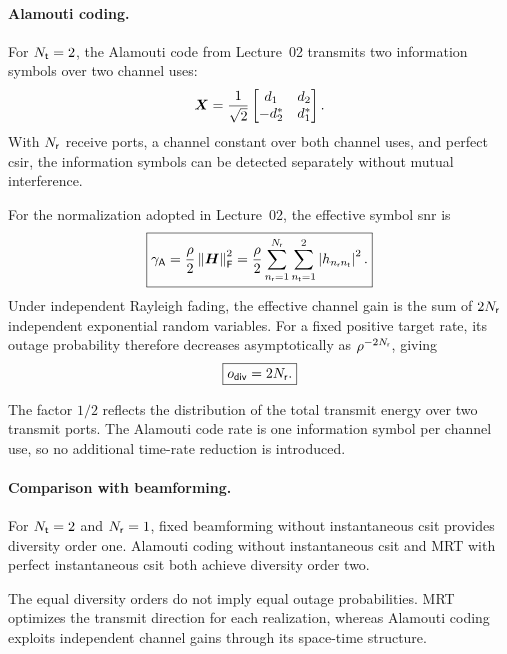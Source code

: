 \paragraph{Alamouti coding.}
For $N_{\mathsf{t}}=2$, the Alamouti code from Lecture~02 transmits two information symbols over two channel uses:
\begin{equation*}
	\bm{X}
	=\frac{1}{\sqrt{2}}
	\begin{bmatrix}
		d_1&d_2\\
		-d_2^*&d_1^*
	\end{bmatrix}.
\end{equation*}
With $N_{\mathsf{r}}$ receive ports, a channel constant over both channel uses, and perfect \ac{csir}, the information symbols can be detected separately without mutual interference.

For the normalization adopted in Lecture~02, the effective symbol \ac{snr} is
\begin{equation}\label{eq:alamouti-snr}
	\boxed{
		\gamma_{\mathsf A}
		=\frac{\rho}{2}\left\|\bm{H}\right\|_{\mathsf{F}}^2
		=\frac{\rho}{2}
		\sum_{n_{\mathsf{r}}=1}^{N_{\mathsf{r}}}\sum_{n_{\mathsf{t}}=1}^{2}
		\left|h_{n_{\mathsf{r}}n_{\mathsf{t}}}\right|^2.
	}
\end{equation}
Under independent Rayleigh fading, the effective channel gain is the sum of $2N_{\mathsf{r}}$ independent exponential random variables. For a fixed positive target rate, its outage probability therefore decreases asymptotically as $\rho^{-2N_{\mathsf{r}}}$, giving
\begin{equation*}
	\boxed{o_{\mathsf{div}}=2N_{\mathsf{r}}.}
\end{equation*}

The factor $1/2$ reflects the distribution of the total transmit energy over two transmit ports. The Alamouti code rate is one information symbol per channel use, so no additional time-rate reduction is introduced.

\paragraph{Comparison with beamforming.}
For $N_{\mathsf{t}}=2$ and $N_{\mathsf{r}}=1$, fixed beamforming without instantaneous \ac{csit} provides diversity order one. Alamouti coding without instantaneous \ac{csit} and MRT with perfect instantaneous \ac{csit} both achieve diversity order two.

The equal diversity orders do not imply equal outage probabilities. MRT optimizes the transmit direction for each realization, whereas Alamouti coding exploits independent channel gains through its space-time structure.

